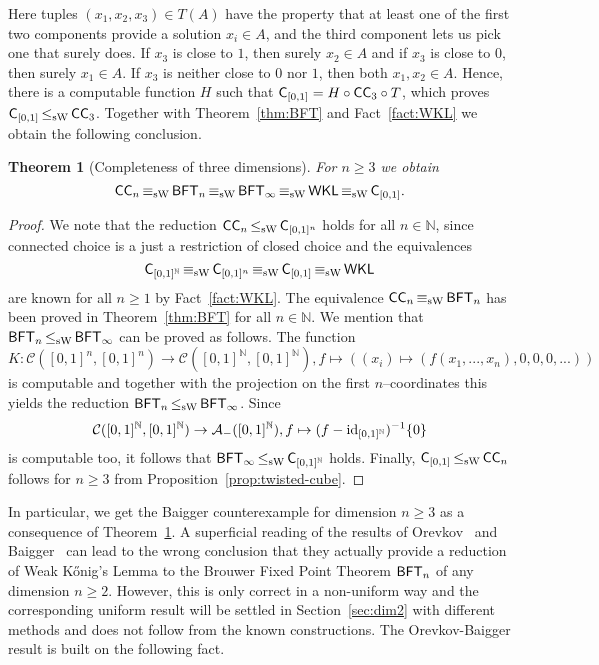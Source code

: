 \documentclass[a4paper]{amsart}
\def\AA{{\mathcal A}}
\def\CC{{\mathcal C}}
\def\IN{{\mathbb{N}}}
\def\id{{\rm id}}
\def\WKL{\text{\rm\sffamily WKL}}
\def\BFT{\mbox{\rm\sffamily BFT}}
\def\C{\mbox{\rm\sffamily C}}
\def\ConC{\mbox{\rm\sffamily CC}}
\def\leqSW{\mathop{\leq_{\mathrm{sW}}}}
\def\equivSW{\mathop{\equiv_{\mathrm{sW}}}}
\newtheorem{theorem}{Theorem}[section]
\theoremstyle{definition}
\begin{document}
Here tuples $(x_1,x_2,x_3)\in T(A)$ have the property that at least one of the
first two components provide a solution $x_i\in A$, and the third component lets us
pick one that surely does. If $x_3$ is close to $1$, then
surely $x_2\in A$ and if $x_3$ is close to $0$, then surely $x_1\in A$. If $x_3$
is neither close to $0$ nor $1$, then both $x_1,x_2\in A$. 
Hence, there is a computable function $H$ such that $\C_{[0,1]}=H\circ\ConC_3\circ T$,
which proves $\C_{[0,1]}\leqSW\ConC_3$. Together with Theorem~\ref{thm:BFT} and Fact~\ref{fact:WKL}
we obtain the following conclusion.

\begin{theorem}[Completeness of three dimensions]
\label{thm:dimension-three}
For $n\geq 3$ we obtain
\[\ConC_n\equivSW\BFT_n\equivSW\BFT_\infty\equivSW\WKL\equivSW\C_{[0,1]}.\]
\end{theorem}
\begin{proof}
We note that the reduction $\ConC_n\leqSW\C_{[0,1]^n}$ holds for all $n\in\IN$,
since connected choice is a just a restriction of closed choice and the equivalences 
\[\C_{[0,1]^\IN}\equivSW\C_{[0,1]^n}\equivSW\C_{[0,1]}\equivSW\WKL\]
are known for all $n\geq1$ by Fact~\ref{fact:WKL}.
The equivalence $\ConC_n\equivSW\BFT_n$ has been proved in Theorem~\ref{thm:BFT}
for all $n\in\IN$. We mention that $\BFT_n\leqSW\BFT_\infty$ can be proved as follows.
The function 
\[K:\CC([0,1]^n,[0,1]^n)\to\CC([0,1]^\IN,[0,1]^\IN),f\mapsto((x_i)\mapsto(f(x_1,...,x_n),0,0,0,...))\]
is computable and together with the projection on the first $n$--coordinates this yields
the reduction $\BFT_n\leqSW\BFT_\infty$. Since 
\[\CC([0,1]^\IN,[0,1]^\IN)\to\AA_-([0,1]^\IN),f\mapsto(f-\id_{[0,1]^\IN})^{-1}\{0\}\]
is computable too, it follows that $\BFT_\infty\leqSW\C_{[0,1]^\IN}$ holds.
Finally, $\C_{[0,1]}\leqSW\ConC_n$ follows for $n\geq3$ from Proposition~\ref{prop:twisted-cube}.
\end{proof}

In particular, we get the Baigger counterexample for dimension $n\geq3$ as a consequence
of Theorem~\ref{thm:dimension-three}.
A superficial reading of the results of Orevkov~\cite{Ore63} and Baigger~\cite{Bai85} can lead to the wrong
conclusion that they actually provide a reduction of Weak K\H{o}nig's Lemma to the Brouwer Fixed Point Theorem
$\BFT_n$ of any dimension $n\geq2$. However, this is only correct in a non-uniform way and the corresponding
uniform result will be settled in Section~\ref{sec:dim2} with different methods and does not follow from the known constructions.
The Orevkov-Baigger result is built on the following fact.
\end{document}
